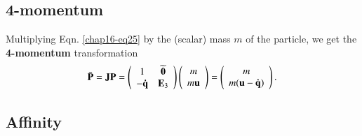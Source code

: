 \subsection{4-momentum}\label{chap16-sec6.4}

Multiplying Eqn. \eqref{chap16-eq25} by  the (scalar) mass $m$ of the particle, we get the \textbf{4-momentum} transformation
\begin{equation}
\bar{\mathbf{P}}=\mathbf{J}{\mathbf{P}}=\left(\begin{array}{cc} 1 & \widetilde{\mathbf{0}}\\
-\mathbf{\dot{q}} & \mathbf{E}_3 \end{array}\right)
\left(\begin{array}{c} m \\ m\mathbf{u} 
\end{array}\right)=\left(\begin{array}{c} 
m\\ m(\mathbf{u}-\mathbf{\dot{q}}) \end{array}\right).\label{chap16-eq26}
\end{equation}

\subsection{Affinity}\label{chap16-sec6.5}

